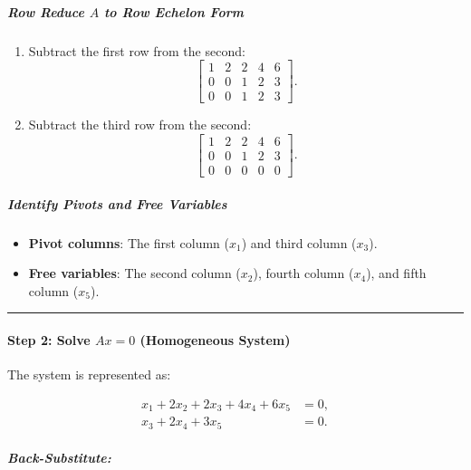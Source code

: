 \documentclass[11pt]{article}
\providecommand{\tightlist}{%
      \setlength{\itemsep}{0pt}\setlength{\parskip}{0pt}}
\begin{document}
\subparagraph{\texorpdfstring{Row Reduce \(A\) to Row Echelon
Form}{Row Reduce A to Row Echelon Form}}\label{row-reduce-a-to-row-echelon-form}

\begin{enumerate}
\def\labelenumi{\arabic{enumi}.}
\item
  Subtract the first row from the second: \[
  \begin{bmatrix}
  1 & 2 & 2 & 4 & 6 \\
  0 & 0 & 1 & 2 & 3 \\
  0 & 0 & 1 & 2 & 3
  \end{bmatrix}.
  \]
\item
  Subtract the third row from the second: \[
  \begin{bmatrix}
  1 & 2 & 2 & 4 & 6 \\
  0 & 0 & 1 & 2 & 3 \\
  0 & 0 & 0 & 0 & 0
  \end{bmatrix}.
  \]
\end{enumerate}

\subparagraph{Identify Pivots and Free
Variables}\label{identify-pivots-and-free-variables}

\begin{itemize}
\tightlist
\item
  \textbf{Pivot columns}: The first column (\(x_1\)) and third column
  (\(x_3\)).
\item
  \textbf{Free variables}: The second column (\(x_2\)), fourth column
  (\(x_4\)), and fifth column (\(x_5\)).
\end{itemize}

\begin{center}\rule{0.5\linewidth}{0.5pt}\end{center}

\paragraph{\texorpdfstring{Step 2: Solve \(Ax = 0\) (Homogeneous
System)}{Step 2: Solve Ax = 0 (Homogeneous System)}}\label{step-2-solve-ax-0-homogeneous-system}

The system is represented as:

\[
\begin{aligned}
x_1 + 2x_2 + 2x_3 + 4x_4 + 6x_5 &= 0, \\
x_3 + 2x_4 + 3x_5 &= 0.
\end{aligned}
\]

\subparagraph{Back-Substitute:}\label{back-substitute}
\end{document}
